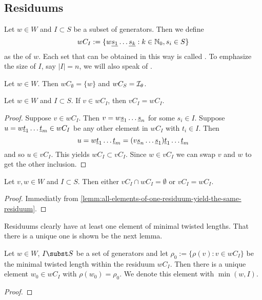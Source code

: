 \subsection{Residuums}
\label{sec:twisted-involutions-residuums}

\begin{defi}
	Let $w \in W$ and $I \subset S$ be a subset of generators. Then we define
	$$ wC_I := \{ w \underline{s_1} \ldots \underline{s_k} : k \in \mathbb{N}_0, s_i \in S \} $$
	as the  of $w$. Each set that can be obtained in this way is called . To emphasize the size of $I$, say $|I| = n$, we will also speak of .
\end{defi}

\begin{exam}
	Let $w \in W$. Then $wC_\emptyset = \{ w \}$ and $wC_S = \mathcal{I}_{\theta}$.
\end{exam}

\begin{lemm}
	Let $w \in W$ and $I \subset S$. If $v \in wC_I$, then $vC_I = wC_I$.

	\begin{proof}
		Suppose $v \in wC_I$. Then $v = w \underline{s}_1 \ldots \underline{s}_n$ for some $s_i \in I$. Suppose $u = w \underline{t}_1 \ldots \underline{t}_m \in wC_I$ be any other element in $wC_I$ with $t_i \in I$. Then
		$$ u = w \underline{t}_1 \ldots \underline{t}_m = (v \underline{s}_n \ldots \underline{s}_1) \underline{t}_1 \ldots \underline{t}_m $$
		and so $u \in vC_I$. This yields $wC_I \subset vC_I$. Since $w \in vC_I$ we can swap $v$ and $w$ to get the other inclusion.
	\end{proof}
\end{lemm}

\begin{coro}
	Let $v, w \in W$ and $I \subset S$. Then either $vC_I \cap wC_I = \emptyset$ or $vC_I = wC_I$.

	\begin{proof}
		Immediatly from \ref{lemm:all-elements-of-one-residuum-yield-the-same-residuum}.
	\end{proof}
\end{coro}

Residuums clearly have at least one element of minimal twisted lengths. That there is a unique one is shown be the next lemma.

\begin{lemm}
	Let $w \in W$, $I \subst S$ be a set of generators and let $\rho_0 := \{ \rho(v) : v \in wC_I \}$ be the minimal twisted length within the residuum $wC_I$. Then there is a unique element $w_0 \in wC_I$ with $\rho(w_0) = \rho_0$. We denote this element with $\min(w,I)$.

	\begin{proof}
		\todo
	\end{proof}
\end{lemm}

